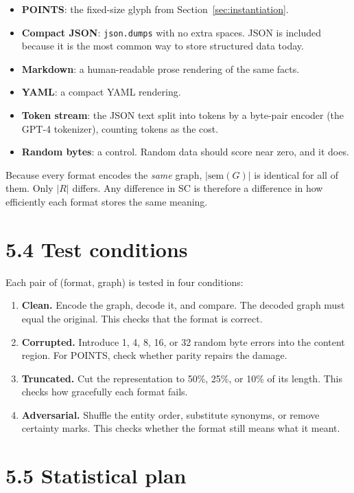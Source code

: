\begin{itemize}
\item \textbf{POINTS}: the fixed-size glyph from Section~\ref{sec:instantiation}.
\item \textbf{Compact JSON}: \texttt{json.dumps} with no extra spaces. JSON is included because it is the most common way to store structured data today.
\item \textbf{Markdown}: a human-readable prose rendering of the same facts.
\item \textbf{YAML}: a compact YAML rendering.
\item \textbf{Token stream}: the JSON text split into tokens by a byte-pair encoder (the GPT-4 tokenizer), counting tokens as the cost.
\item \textbf{Random bytes}: a control. Random data should score near zero, and it does.
\end{itemize}

Because every format encodes the \textit{same} graph, $|\text{sem}(G)|$ is identical for all of them. Only $|R|$ differs. Any difference in SC is therefore a difference in how efficiently each format stores the same meaning.

\section*{5.4 Test conditions}

Each pair of (format, graph) is tested in four conditions:

\begin{enumerate}
\item \textbf{Clean.} Encode the graph, decode it, and compare. The decoded graph must equal the original. This checks that the format is correct.
\item \textbf{Corrupted.} Introduce 1, 4, 8, 16, or 32 random byte errors into the content region. For POINTS, check whether parity repairs the damage.
\item \textbf{Truncated.} Cut the representation to 50\%, 25\%, or 10\% of its length. This checks how gracefully each format fails.
\item \textbf{Adversarial.} Shuffle the entity order, substitute synonyms, or remove certainty marks. This checks whether the format still means what it meant.
\end{enumerate}

\section*{5.5 Statistical plan}

